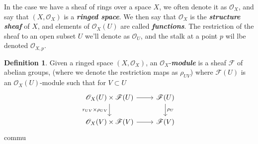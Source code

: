 \documentclass[psamsfonts]{amsart}
\theoremstyle{definition}
\newtheorem{defn}[thm]{Definition}
\theoremstyle{remark}
\newcommand{\ib}[1]{\textbf{\textit{#1}}}
\begin{document}
%
In the case we have a sheaf of rings over a space $X$, we often denote it as $\mathscr{O}_X$, and say that $(X, \mathscr{O}_X)$ is a \ib{ringed space}. We then say that $\mathscr{O}_X$ is the \ib{structure sheaf} of $X$, and elements of $\mathscr{O}_X(U)$ are called \ib{functions}. The restriction of the sheaf to an open subset $U$ we'll denote as $\mathscr{O}_U$, and the stalk at a point $p$ wil lbe denoted $\mathscr{O}_{X,p}$. 
\begin{defn}
Given a ringed space $(X,\mathscr{O}_X)$, an $\mathscr{O}_X$-\ib{module} is a sheaf $\mathscr{F}$ of abelian groups, (where we denote the restriction maps as $\rho_{UV}$) where $\mathscr{F}(U)$ is an $\mathscr{O}_X(U)$-module such that for $V \subset U$
$$\begin{tikzcd}
\mathscr{O}_X(U) \times \mathscr{F}(U) \ar[d, "r_{UV} \times \rho_{UV}"']\ar[r] & \mathscr{F}(U) \ar[d, "\rho_U"] \\
\mathscr{O}_X(V) \times \mathscr{F}(V) \ar[r] & \mathscr{F}(V)
\end{tikzcd}$$
commu
\end{defn}
%
\end{document}
